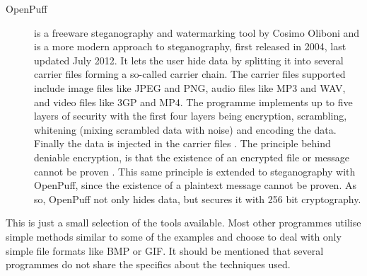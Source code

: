 \begin{description}
	\item[OpenPuff] is a freeware steganography and watermarking tool by Cosimo Oliboni and is a more modern approach to steganography, first released in 		2004, last updated July 2012.
	It lets the user hide data by splitting it into several carrier files forming a so-called carrier chain.
	The carrier files supported include image files like JPEG and PNG, audio files like MP3 and WAV, and video files like 3GP and MP4.
	The programme implements up to five layers of security with the first four layers being encryption, scrambling, whitening (mixing scrambled data with noise) and encoding the data.
	Finally the data is injected in the carrier files \citep{Oliboni2012}.
	The principle behind deniable encryption, is that the existence of an encrypted file or message cannot be proven \citep{Schneier2008}.
	This same principle is extended to steganography with OpenPuff, since the existence of a plaintext message cannot be proven.
	As so, OpenPuff not only hides data, but secures it with 256 bit cryptography.
\end{description}

\noindent This is just a small selection of the tools available.
Most other programmes utilise simple methods similar to some of the examples and choose to deal with only simple file formats like BMP or GIF.
It should be mentioned that several programmes do not share the specifics about the techniques used.
